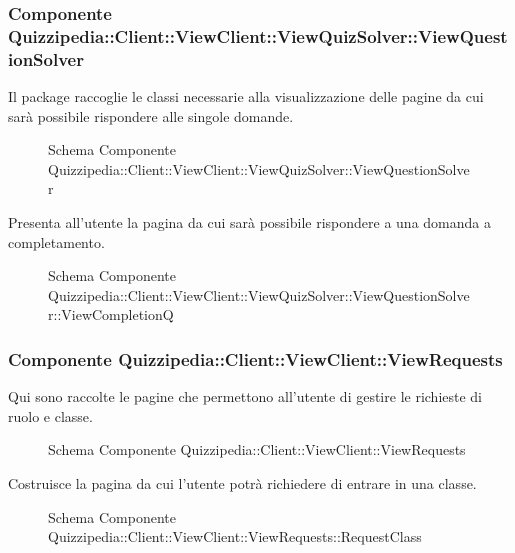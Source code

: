 \subsubsection{Componente Quizzipedia::Client::ViewClient::ViewQuizSolver::ViewQuestionSolver}
Il package raccoglie le classi necessarie alla visualizzazione delle pagine da cui sarà possibile rispondere alle singole domande.
\begin{figure}[H]
\centering
\noindent{}
\caption{Schema Componente Quizzipedia::Client::ViewClient::ViewQuizSolver::ViewQuestionSolver}
\end{figure}
Presenta all'utente la pagina da cui sarà possibile rispondere a una domanda a completamento.
\begin{figure}[H]
\centering
\noindent{}
\caption{Schema Componente Quizzipedia::Client::ViewClient::ViewQuizSolver::ViewQuestionSolver::ViewCompletionQ}
\end{figure}
\subsubsection{Componente Quizzipedia::Client::ViewClient::ViewRequests}
Qui sono raccolte le pagine che permettono all'utente di gestire le richieste di ruolo e classe.
\begin{figure}[H]
\centering
\noindent{}
\caption{Schema Componente Quizzipedia::Client::ViewClient::ViewRequests}
\end{figure}
Costruisce la pagina da cui l'utente potrà richiedere di entrare in una classe.
\begin{figure}[H]
\centering
\noindent{}
\caption{Schema Componente Quizzipedia::Client::ViewClient::ViewRequests::RequestClass}
\end{figure}
